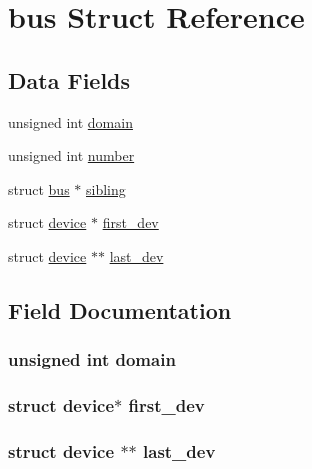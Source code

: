 \hypertarget{structbus}{}\section{bus Struct Reference}
\label{structbus}
\subsection*{Data Fields}
\begin{DoxyCompactItemize}
\item 
unsigned int \hyperlink{structbus_a96ef643a7d21b1e41ee9a10872687a29}{domain}
\item 
unsigned int \hyperlink{structbus_ae8d56af1549c1276c20aae645c223ab1}{number}
\item 
struct \hyperlink{structbus}{bus} $\ast$ \hyperlink{structbus_ab0b9175a10aa173a7cee05c0df6a18da}{sibling}
\item 
struct \hyperlink{structdevice}{device} $\ast$ \hyperlink{structbus_a3c7b44cedeb27f18fc6a2966c630a5fe}{first\+\_\+dev}
\item 
struct \hyperlink{structdevice}{device} $\ast$$\ast$ \hyperlink{structbus_a1fa6380a081f4a440196e66cff55df6a}{last\+\_\+dev}
\end{DoxyCompactItemize}


\subsection{Field Documentation}
\subsubsection[{\texorpdfstring{domain}{domain}}]{\setlength{\rightskip}{0pt plus 5cm}unsigned int domain}\hypertarget{structbus_a96ef643a7d21b1e41ee9a10872687a29}{}\label{structbus_a96ef643a7d21b1e41ee9a10872687a29}
\subsubsection[{\texorpdfstring{first\+\_\+dev}{first_dev}}]{\setlength{\rightskip}{0pt plus 5cm}struct {\bf device}$\ast$ first\+\_\+dev}\hypertarget{structbus_a3c7b44cedeb27f18fc6a2966c630a5fe}{}\label{structbus_a3c7b44cedeb27f18fc6a2966c630a5fe}
\subsubsection[{\texorpdfstring{last\+\_\+dev}{last_dev}}]{\setlength{\rightskip}{0pt plus 5cm}struct {\bf device} $\ast$$\ast$ last\+\_\+dev}\hypertarget{structbus_a1fa6380a081f4a440196e66cff55df6a}{}\label{structbus_a1fa6380a081f4a440196e66cff55df6a}
